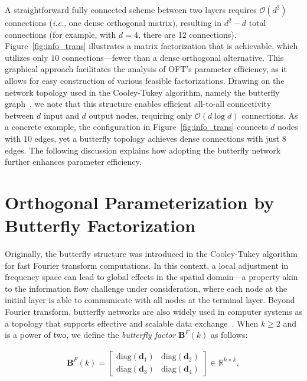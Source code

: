 A straightforward fully connected scheme between two layers requires $\mathcal{O}(d^2)$ connections (\emph{i.e.}, one dense orthogonal matrix), resulting in $d^2 - d$ total connections (for example, with $d=4$, there are 12 connections). Figure~\ref{fig:info_trans} illustrates a matrix factorization that is achievable, which utilizes only $10$ connections—fewer than a dense orthogonal alternative. This graphical approach facilitates the analysis of OFT’s parameter efficiency, as it allows for easy construction of various feasible factorizations. Drawing on the network topology used in the Cooley-Tukey algorithm, namely the butterfly graph~\cite{cooley1965algorithm}, we note that this structure enables efficient all-to-all connectivity between $d$ input and $d$ output nodes, requiring only $\mathcal{O}(d\log d)$ connections. As a concrete example, the configuration in Figure~\ref{fig:info_trans} connects $d$ nodes with $10$ edges, yet a butterfly topology achieves dense connections with just $8$ edges. The following discussion explains how adopting the butterfly network further enhances parameter efficiency.

\section{Orthogonal Parameterization by Butterfly Factorization}

Originally, the butterfly structure was introduced in the Cooley-Tukey algorithm for fast Fourier transform computations. In this context, a local adjustment in frequency space can lead to global effects in the spatial domain—a property akin to the information flow challenge under consideration, where each node at the initial layer is able to communicate with all nodes at the terminal layer. Beyond Fourier transform, butterfly networks are also widely used in computer systems as a topology that supports effective and scalable data exchange~\cite{solihin2015fundamentals,li2011linear}. When $k\geq 2$ and is a power of two, we define the \emph{butterfly factor} $\bm{B}^F(k)$ as follows:

\begin{equation}\label{eq:but_factor}
\begin{aligned}
    \bm{B}^F(k)=\begin{bmatrix}
    \text{diag}(\bm{d}_1) & \text{diag}(\bm{d}_2) \\
    \text{diag}(\bm{d}_3) & \text{diag}(\bm{d}_4)
    \end{bmatrix}\in\mathbb{R}^{k\times k},
\end{aligned}
\end{equation}

